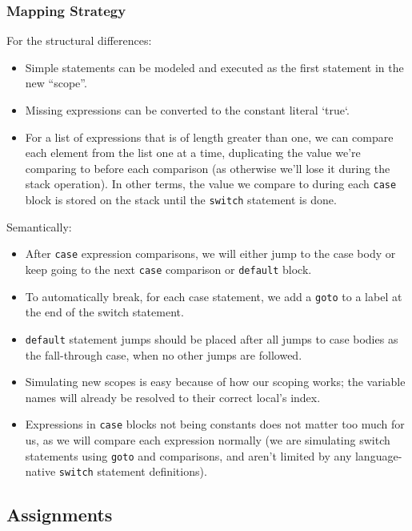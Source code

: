 \documentclass[11pt]{article}
\begin{document}
\subsubsection{Mapping Strategy}
\label{sec:org063df13}
For the structural differences:
\begin{itemize}[noitemsep]
\item Simple statements can be modeled and executed as the first statement in
the new ``scope''.
\item Missing expressions can be converted to the constant literal `true`.
\item For a list of expressions that is of length greater than one, we
can compare each element from the list one at a time, duplicating the
value we're comparing to before each comparison (as otherwise
we'll lose it during the stack operation). In other terms, the value we
compare to during each \texttt{case} block is stored on the stack until the
\texttt{switch} statement is done.
\end{itemize}
Semantically:
\begin{itemize}[noitemsep]
\item After \texttt{case} expression comparisons, we will either jump to the case body
or keep going to the next \texttt{case} comparison or \texttt{default} block.
\item To automatically break, for each case statement, we add a \texttt{goto}
to a label at the end of the switch statement.
\item \texttt{default} statement jumps should be placed after all jumps to case bodies
as the fall-through case, when no other jumps are followed.
\item Simulating new scopes is easy because of how our scoping works;
the variable names will already be resolved to their correct local's
index.
\item Expressions in \texttt{case} blocks not being constants does not matter too much
for us, as we will compare each expression normally (we are
simulating switch statements using \texttt{goto} and comparisons, and aren't
limited by any language-native \texttt{switch} statement definitions).
\end{itemize}
\subsection{Assignments}
\label{sec:org6c54d21}
\end{document}
